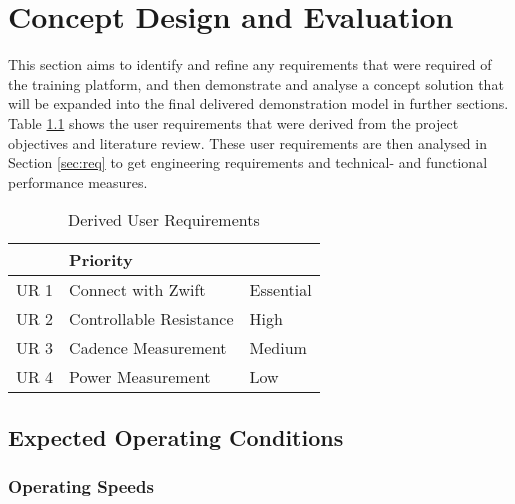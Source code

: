 
\chapter{Concept Design and Evaluation}

\color{red}

This section aims to identify and refine any requirements that were required of the training platform, and then demonstrate and analyse a concept solution that will be expanded into the final delivered demonstration model in further sections. Table \ref{tab:conditions} shows the user requirements that were derived from the project objectives and literature review. These user requirements are then analysed in Section \ref{sec:req} to get engineering requirements and technical- and functional performance measures.

\begin{table}[H]
	\centering
	\caption{Derived User Requirements}
	\begin{tabularx}{\textwidth}{>{\raggedright}p{1 cm} X >{\raggedright\arraybackslash}p{2cm}}
		\toprule
		\multicolumn{2}{c}{User Requirement} & Priority                            \\
		\midrule
		UR 1                                 & Connect with Zwift      & Essential \\
		UR 2                                 & Controllable Resistance & High      \\
		UR 3                                 & Cadence Measurement     & Medium    \\
		UR 4                                 & Power Measurement       & Low       \\
		\bottomrule
	\end{tabularx}
	\label{tab:conditions}
\end{table}

\color{black}

\newpage

\section{Expected Operating Conditions}
\subsection{Operating Speeds}
\label{sec:opspeedc}


